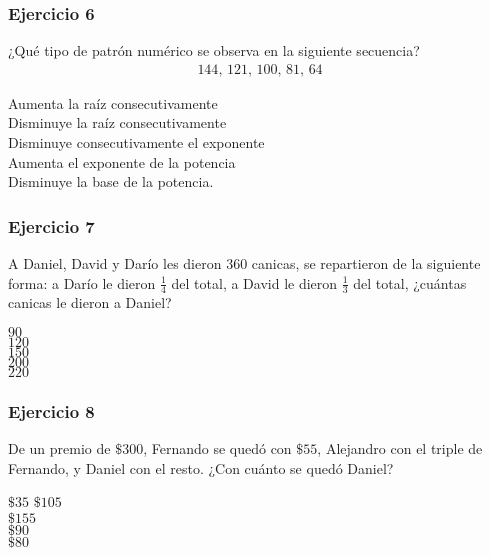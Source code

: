 \begin{frame}
\frametitle{Ejercicio 6}
¿Qué tipo de patrón numérico se observa en la siguiente secuencia?
\begin{align*}
144, \, 121, \, 100, \, 81, \, 64
\end{align*}
\begin{choices}
\choice Aumenta la raíz consecutivamente \\
\choice Disminuye la raíz consecutivamente \\
\choice Disminuye consecutivamente el exponente \\
\choice Aumenta el exponente de la potencia \\
\choice Disminuye la base de la potencia.
\end{choices}
\pause
{}
\end{frame}
\begin{frame}
\frametitle{Ejercicio 7}
A Daniel, David y Darío les dieron 360 canicas, se repartieron de la siguiente forma: a Darío le dieron $\frac{1}{4}$ del total, a David le dieron $\frac{1}{3}$ del total, ¿cuántas canicas le dieron a Daniel?
\begin{choices}
\choice $90$ \\
\choice $120$ \\
\choice $150$ \\
\choice $200$ \\
\choice $220$
\end{choices}
\pause
{}
\end{frame}
\begin{frame}
\frametitle{Ejercicio 8}
De un premio de $\$300$, Fernando se quedó con $\$55$, Alejandro con el triple de Fernando, y Daniel con el resto. ¿Con cuánto se quedó Daniel?
\begin{choices}
\choice $\$35$
\choice $\$105$ \\
\choice $\$155$ \\
\choice $\$90$ \\
\choice $\$80$ \\
\end{choices}
\pause
{}
\end{frame}
